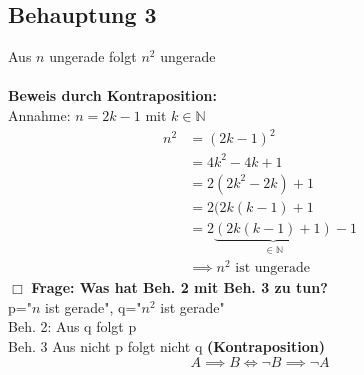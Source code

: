 \documentclass{article}
\begin{document}
        \subsection{Behauptung 3}
            Aus $n$ ungerade folgt $n^2$ ungerade\\\\
            \textbf{Beweis durch Kontraposition:}\\
                Annahme: $n=2k-1$ mit $k\in \mathbb{N}$
                \begin{align*}
                    n^2 &= (2k-1)^2 \\
                    \, &= 4k^2 - 4k + 1 \\
                    \, &= 2(2k^2 - 2k) + 1 \\
                    \, &= 2(2k(k-1) + 1 \\
                    \, &= 2\underbrace{(2k(k-1)+1)}_{\in \mathbb{N}} - 1 \\
                    &\implies n^2 \text{ ist ungerade}
                \end{align*}
		\hfill $\Box$
            \textbf{Frage: Was hat Beh. 2 mit Beh. 3 zu tun?}\\
            p="$n$ ist gerade", q="$n^2$ ist gerade"\\
            Beh. 2: Aus q folgt p\\
            Beh. 3 Aus nicht p folgt nicht q \textbf{(Kontraposition)}
            \textbf{$$A\implies B \Leftrightarrow \lnot B \implies \lnot A$$}
\end{document}
